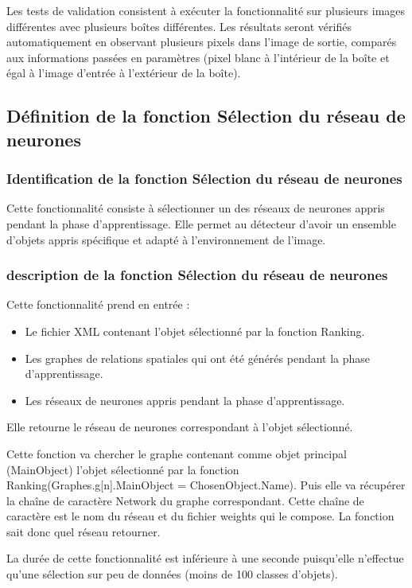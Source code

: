 \documentclass[debug,nodate,hideweeklyreports]{polytech/polytech}
\begin{document}
Les tests de validation consistent à exécuter la fonctionnalité sur plusieurs images différentes avec plusieurs boîtes différentes. Les résultats seront vérifiés automatiquement en observant plusieurs pixels dans l'image de sortie, comparés aux informations passées en paramètres (pixel blanc à l'intérieur de la boîte et égal à l'image d'entrée à l'extérieur de la boîte).

\subsection{Définition de la fonction Sélection du réseau de neurones}

\subsubsection{Identification de la fonction Sélection du réseau de neurones}

Cette fonctionnalité consiste à sélectionner un des réseaux de neurones appris pendant la phase d’apprentissage. Elle permet au détecteur d’avoir un ensemble d’objets appris spécifique et adapté à l’environnement de l’image.

\subsubsection{description de la fonction Sélection du réseau de neurones}

Cette fonctionnalité prend en entrée : 
\begin{itemize}
\item Le fichier XML contenant l’objet sélectionné par la fonction Ranking.
\item Les graphes de relations spatiales qui ont été générés pendant la phase d’apprentissage.
\item Les réseaux de neurones appris pendant la phase d’apprentissage.
\end{itemize}

Elle retourne le réseau de neurones correspondant à l’objet sélectionné.

Cette fonction va chercher le graphe contenant comme objet principal (MainObject) l’objet sélectionné par la fonction Ranking(Graphes.g[n].MainObject = ChosenObject.Name).
Puis elle va récupérer la chaîne de caractère Network du graphe correspondant.
Cette chaîne de caractère est le nom du réseau et du fichier weights qui le compose. La fonction sait donc quel réseau retourner.

La durée de cette fonctionnalité est inférieure à une seconde puisqu'elle n'effectue qu'une sélection sur peu de données (moins de 100 classes d'objets).
\end{document}
